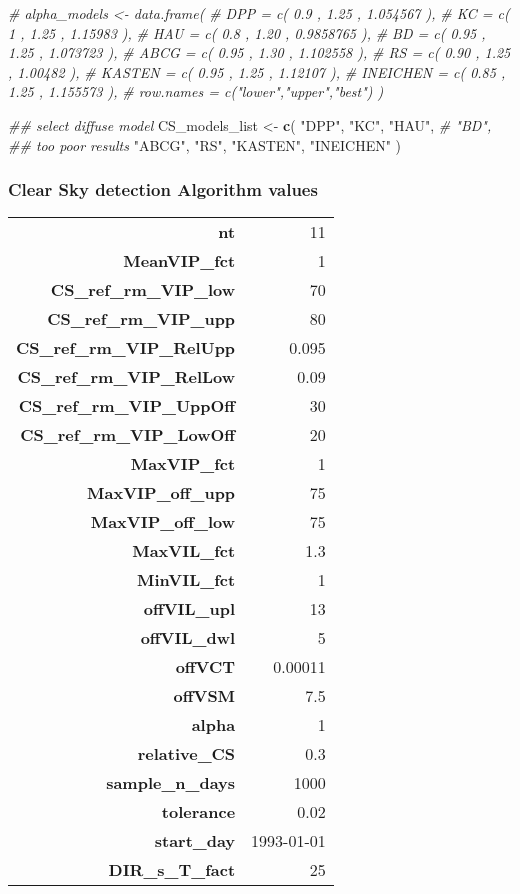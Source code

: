 \documentclass[
  10pt,
  a4paper,oneside]{article}
\newenvironment{Shaded}{\begin{snugshade}}{\end{snugshade}}
\newcommand{\CommentTok}[1]{\textcolor[rgb]{0.56,0.35,0.01}{\textit{#1}}}
\newcommand{\KeywordTok}[1]{\textcolor[rgb]{0.13,0.29,0.53}{\textbf{#1}}}
\newcommand{\NormalTok}[1]{#1}
\newcommand{\StringTok}[1]{\textcolor[rgb]{0.31,0.60,0.02}{#1}}
\begin{document}
\begin{Shaded}
\begin{Highlighting}[]
\CommentTok{\# alpha\_models \textless{}{-} data.frame(}
\CommentTok{\#     DPP      = c( 0.9  , 1.25 , 1.054567  ),}
\CommentTok{\#     KC       = c( 1    , 1.25 , 1.15983   ),}
\CommentTok{\#     HAU      = c( 0.8  , 1.20 , 0.9858765 ),}
\CommentTok{\#     BD       = c( 0.95 , 1.25 , 1.073723  ),}
\CommentTok{\#     ABCG     = c( 0.95 , 1.30 , 1.102558  ),}
\CommentTok{\#     RS       = c( 0.90 , 1.25 , 1.00482   ),}
\CommentTok{\#     KASTEN   = c( 0.95 , 1.25 , 1.12107   ),}
\CommentTok{\#     INEICHEN = c( 0.85 , 1.25 , 1.155573  ),}
\CommentTok{\#     row.names = c("lower","upper","best") )}

\CommentTok{\#\# select diffuse model}
\NormalTok{CS\_models\_list \textless{}{-}}\StringTok{ }\KeywordTok{c}\NormalTok{(}
                    \StringTok{"DPP"}\NormalTok{,}
                    \StringTok{"KC"}\NormalTok{,}
                    \StringTok{"HAU"}\NormalTok{,}
                    \CommentTok{\# "BD",       \#\# too poor results}
                    \StringTok{"ABCG"}\NormalTok{,}
                    \StringTok{"RS"}\NormalTok{,}
                    \StringTok{"KASTEN"}\NormalTok{,}
                    \StringTok{"INEICHEN"}
\NormalTok{                  )}
\end{Highlighting}
\end{Shaded}

\hypertarget{clear-sky-detection-algorithm-values}{%
\subsubsection{Clear Sky detection Algorithm values}\label{clear-sky-detection-algorithm-values}}

\begin{longtable}[]{@{}rr@{}}
\toprule
\endhead
\textbf{nt} & 11\tabularnewline
\textbf{MeanVIP\_fct} & 1\tabularnewline
\textbf{CS\_ref\_rm\_VIP\_low} & 70\tabularnewline
\textbf{CS\_ref\_rm\_VIP\_upp} & 80\tabularnewline
\textbf{CS\_ref\_rm\_VIP\_RelUpp} & 0.095\tabularnewline
\textbf{CS\_ref\_rm\_VIP\_RelLow} & 0.09\tabularnewline
\textbf{CS\_ref\_rm\_VIP\_UppOff} & 30\tabularnewline
\textbf{CS\_ref\_rm\_VIP\_LowOff} & 20\tabularnewline
\textbf{MaxVIP\_fct} & 1\tabularnewline
\textbf{MaxVIP\_off\_upp} & 75\tabularnewline
\textbf{MaxVIP\_off\_low} & 75\tabularnewline
\textbf{MaxVIL\_fct} & 1.3\tabularnewline
\textbf{MinVIL\_fct} & 1\tabularnewline
\textbf{offVIL\_upl} & 13\tabularnewline
\textbf{offVIL\_dwl} & 5\tabularnewline
\textbf{offVCT} & 0.00011\tabularnewline
\textbf{offVSM} & 7.5\tabularnewline
\textbf{alpha} & 1\tabularnewline
\textbf{relative\_CS} & 0.3\tabularnewline
\textbf{sample\_n\_days} & 1000\tabularnewline
\textbf{tolerance} & 0.02\tabularnewline
\textbf{start\_day} & 1993-01-01\tabularnewline
\textbf{DIR\_s\_T\_fact} & 25\tabularnewline
\bottomrule
\end{longtable}
\end{document}
